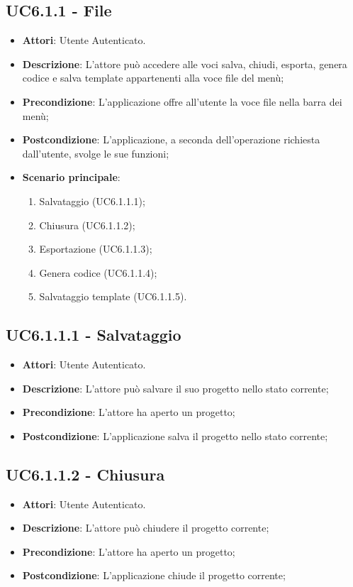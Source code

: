 \subsection{UC6.1.1 - File} 
\label{ssec:UC6.1.1} 
\begin{itemize} 
\item \textbf{Attori}: Utente Autenticato.
\item \textbf{Descrizione}: L’attore può accedere alle voci salva, chiudi, esporta, genera codice e salva template appartenenti alla voce file del menù;
\item \textbf{Precondizione}: L’applicazione offre all’utente la voce file nella barra dei menù;
\item \textbf{Postcondizione}: L’applicazione, a seconda dell’operazione richiesta dall’utente,
svolge le sue funzioni;
\item \textbf{Scenario principale}: \begin{enumerate}\item Salvataggio (UC6.1.1.1);\item Chiusura (UC6.1.1.2);\item Esportazione (UC6.1.1.3);\item Genera codice (UC6.1.1.4);\item Salvataggio template (UC6.1.1.5). 
 \end{enumerate}
\end{itemize} 
\subsection{UC6.1.1.1 - Salvataggio} 
\label{ssec:UC6.1.1.1} 
\begin{itemize} 
\item \textbf{Attori}: Utente Autenticato.
\item \textbf{Descrizione}: L’attore può salvare il suo progetto nello stato corrente;
\item \textbf{Precondizione}: L’attore ha aperto un progetto;
\item \textbf{Postcondizione}: L’applicazione salva il progetto nello stato corrente;
\end{itemize} 
\subsection{UC6.1.1.2 - Chiusura} 
\label{ssec:UC6.1.1.2} 
\begin{itemize} 
\item \textbf{Attori}: Utente Autenticato.
\item \textbf{Descrizione}: L’attore può chiudere il progetto corrente;
\item \textbf{Precondizione}: L'attore ha aperto un progetto;
\item \textbf{Postcondizione}: L’applicazione chiude il progetto corrente;
\end{itemize} 
